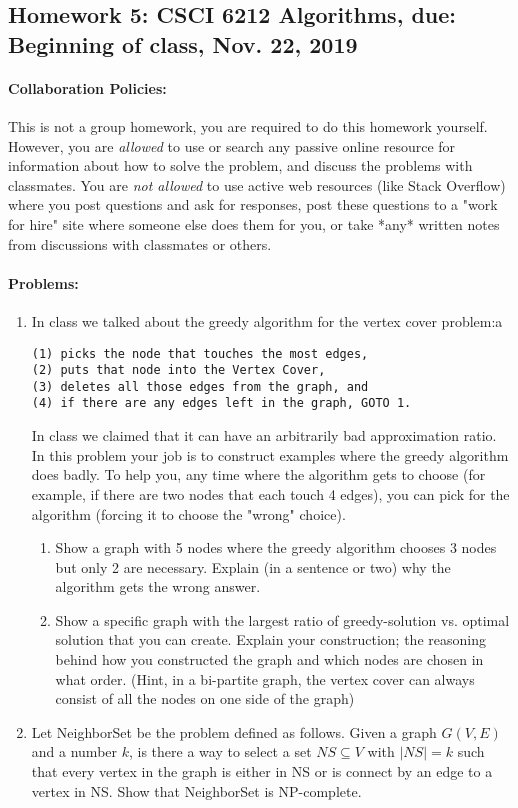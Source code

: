 \documentclass[11pt,letterpaper]{article}
\begin{document}
\subsection*{Homework 5: CSCI 6212 Algorithms, due: Beginning of class, Nov. 22, 2019}
    \paragraph{Collaboration Policies:} This is not a group homework, you are required to do this homework yourself.  However, you are {\em allowed} to use or search any passive online resource for information about how to solve the problem, and discuss the problems with classmates.  
    You are {\em not allowed} to use active web resources (like Stack Overflow) where you post questions and ask for responses, post these questions to a "work for hire" site where someone else does them for you, or take *any* written notes from discussions with classmates or others. 

\paragraph{Problems:}
\begin{enumerate}

\item In class we talked about the greedy algorithm for the 
vertex cover problem:a
\begin{verbatim}
(1) picks the node that touches the most edges,
(2) puts that node into the Vertex Cover, 
(3) deletes all those edges from the graph, and
(4) if there are any edges left in the graph, GOTO 1.
\end{verbatim}

In class we claimed that it can have an arbitrarily bad approximation ratio.  In this problem your job is to construct examples where the greedy algorithm does badly.  
To help you, any time where the algorithm gets to choose (for example, if there are two nodes that each touch 4 edges), you can pick for the algorithm (forcing it to choose the "wrong" choice).
\begin{enumerate}
\item Show a graph with 5 nodes where the greedy algorithm chooses 3 nodes but only 2 are necessary.  Explain (in a sentence or two) why the algorithm gets the wrong answer.
\item Show a specific graph with the largest ratio of greedy-solution vs. optimal solution that you can create.  Explain your construction; the reasoning behind how you constructed the graph and which nodes are chosen in what order.  (Hint, in a bi-partite graph, the vertex cover can always consist of all the nodes on one side of the graph)
\end{enumerate}
\item Let NeighborSet be the problem defined as follows. Given a graph $G(V,E)$ and a
number $k$, is there a way to select a set $NS \subseteq V$ with $|NS| = k$ such that every vertex in
the graph is either in NS or is connect by an edge to a vertex in NS. Show that NeighborSet is NP-complete.
\end{enumerate}
\end{document}
